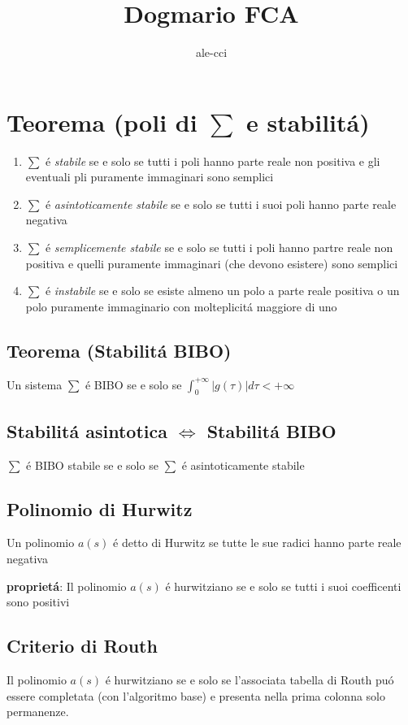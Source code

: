 \documentclass{article}
\title {Dogmario FCA}
\author{ale-cci}
\begin{document}
\section{Teorema (poli di $\sum$ e stabilit\'a)}
\begin{enumerate}
    \item $\sum$ \'e \textit{stabile} se e solo se tutti i poli hanno parte reale non positiva e gli eventuali pli puramente immaginari sono semplici
    \item $\sum$ \'e \textit{asintoticamente stabile} se e solo se tutti i suoi poli hanno parte reale negativa
    \item $\sum$ \'e \textit{semplicemente stabile} se e solo se tutti i poli hanno partre reale non positiva e quelli puramente immaginari (che devono esistere) sono semplici
    \item $\sum$ \'e \textit{instabile} se e solo se esiste almeno un polo a parte reale positiva o un polo puramente immaginario con molteplicit\'a maggiore di uno
\end{enumerate}
\subsection{Teorema (Stabilit\'a BIBO)}
Un sistema $\sum$ \'e BIBO se e solo se $\int_0^{+\infty} | g(\tau) | d\tau < + \infty$

\subsection{Stabilit\'a asintotica $\Leftrightarrow$ Stabilit\'a BIBO}
$\sum$ \'e BIBO stabile se e solo se $\sum$ \'e asintoticamente stabile

\subsection{Polinomio di Hurwitz}
Un polinomio $a(s)$ \'e detto di Hurwitz se tutte le sue radici hanno parte reale negativa

\textbf{propriet\'a}: Il polinomio $a(s)$ \'e hurwitziano se e solo se tutti i suoi coefficenti sono positivi

\subsection{Criterio di Routh}
Il polinomio $a(s)$ \'e hurwitziano se e solo se l'associata tabella di Routh pu\'o essere completata (con l'algoritmo base) e presenta nella prima colonna solo permanenze.
\end{document}
